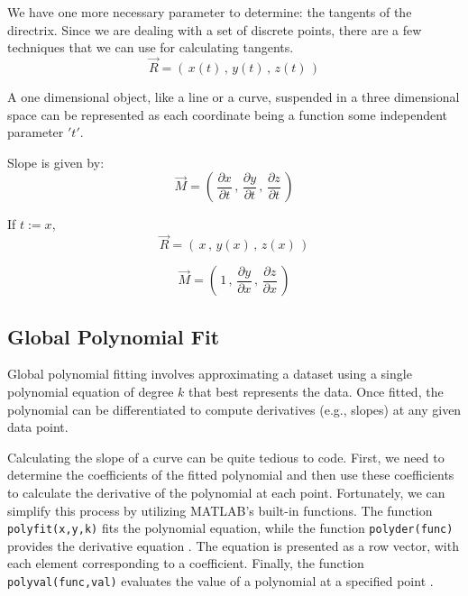 \documentclass[a4paper]{article}
\begin{document}
We have one more necessary parameter to determine: the tangents of the directrix. Since we are dealing with a set of discrete points, there are a few techniques that we can use for calculating tangents.
\[\Vec{R}  =  \left(\, x(t)\,  ,\,  y(t) \, , \,  z(t)\, \right)\]

A one dimensional object, like a line or a curve, suspended in a three dimensional space can be represented as each coordinate being a function some independent parameter $'t'$.

Slope is given by:\[  \Vec{M}  =  \left(\, \frac{\partial x}{\partial t} \, ,\,  \frac{\partial y}{\partial t}\,  ,\,  \frac{\partial z}{\partial t}\, \right) \]

If \(t := x\),
\[\Vec{R}  =  \left( \,x\,  ,\,  y(x) \, ,\,  z(x) \,\right)\]

\[  \Vec{M}  =  \left( \,1 \, ,\,  \frac{\partial y}{\partial x}  \,,\,  \frac{\partial z}{\partial x}\, \right) \]
\pagebreak
\hypertarget{global-fit}{%
\subsection{Global Polynomial Fit}\label{GlobalFit}}
Global polynomial fitting involves approximating a dataset using a single polynomial equation of degree $k$ that best represents the data. Once fitted, the polynomial can be differentiated to compute derivatives (e.g., slopes) at any given data point.

Calculating the slope of a curve can be quite tedious to code. First, we need to determine the coefficients of the fitted polynomial and then use these coefficients to calculate the derivative of the polynomial at each point. Fortunately, we can simplify this process by utilizing MATLAB’s built-in functions. The function \verb|polyfit(x,y,k)| fits the polynomial equation, while the function \verb|polyder(func)| provides the derivative equation \cite{mathworks_polyfit}\cite{mathworks_polyder}. The equation is presented as a row vector, with each element corresponding to a coefficient. Finally, the function \verb|polyval(func,val)| evaluates the value of a polynomial at a specified point \cite{mathworks_polyval}.
\end{document}
